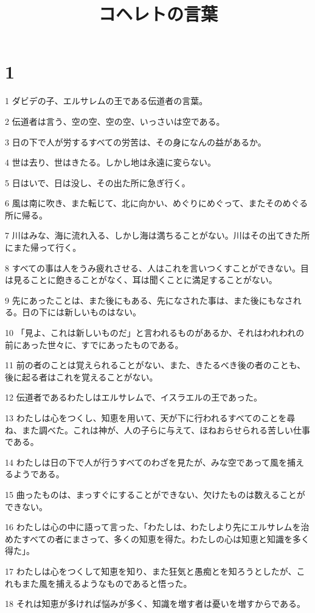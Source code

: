 

\title{コヘレトの言葉}


\chapter{1}

\par 1 ダビデの子、エルサレムの王である伝道者の言葉。
\par 2 伝道者は言う、空の空、空の空、いっさいは空である。
\par 3 日の下で人が労するすべての労苦は、その身になんの益があるか。
\par 4 世は去り、世はきたる。しかし地は永遠に変らない。
\par 5 日はいで、日は没し、その出た所に急ぎ行く。
\par 6 風は南に吹き、また転じて、北に向かい、めぐりにめぐって、またそのめぐる所に帰る。
\par 7 川はみな、海に流れ入る、しかし海は満ちることがない。川はその出てきた所にまた帰って行く。
\par 8 すべての事は人をうみ疲れさせる、人はこれを言いつくすことができない。目は見ることに飽きることがなく、耳は聞くことに満足することがない。
\par 9 先にあったことは、また後にもある、先になされた事は、また後にもなされる。日の下には新しいものはない。
\par 10 「見よ、これは新しいものだ」と言われるものがあるか、それはわれわれの前にあった世々に、すでにあったものである。
\par 11 前の者のことは覚えられることがない、また、きたるべき後の者のことも、後に起る者はこれを覚えることがない。
\par 12 伝道者であるわたしはエルサレムで、イスラエルの王であった。
\par 13 わたしは心をつくし、知恵を用いて、天が下に行われるすべてのことを尋ね、また調べた。これは神が、人の子らに与えて、ほねおらせられる苦しい仕事である。
\par 14 わたしは日の下で人が行うすべてのわざを見たが、みな空であって風を捕えるようである。
\par 15 曲ったものは、まっすぐにすることができない、欠けたものは数えることができない。
\par 16 わたしは心の中に語って言った、「わたしは、わたしより先にエルサレムを治めたすべての者にまさって、多くの知恵を得た。わたしの心は知恵と知識を多く得た」。
\par 17 わたしは心をつくして知恵を知り、また狂気と愚痴とを知ろうとしたが、これもまた風を捕えるようなものであると悟った。
\par 18 それは知恵が多ければ悩みが多く、知識を増す者は憂いを増すからである。

